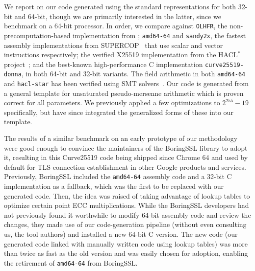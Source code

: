\documentclass[letterpaper,twocolumn,10pt]{article}
\begin{document}
We report on our code generated using the standard representations for both 32-bit and 64-bit, though we are primarily interested in the latter, since we benchmark on a 64-bit processor.
In order, we compare against \texttt{OLHFR}, the non-precomputation-based implementation from \cite{oliveira_sac2017}; \texttt{amd64-64} and \texttt{sandy2x}, the fastest assembly implementations from SUPERCOP~\cite{SUPERCOP} that use scalar and vector instructions respectively; the verified X25519 implementation from the HACL$^*$ project~\cite{hacl}; and the best-known high-performance C implementation \texttt{curve25519-donna}, in both 64-bit and 32-bit variants.
The field arithmetic in both \texttt{amd64-64} and \texttt{hacl-star} has been verified using SMT solvers~\cite{verif25519,ECCstar}.
Our code is generated from a general template for unsaturated pseudo-mersenne arithmetic which is proven correct for all parameters.
We previously applied a few optimizations to $2^{255}-19$ specifically, but have since integrated the generalized forms of these into our template.

The results of a similar benchmark on an early prototype of our methodology were good enough to convince the maintainers of the BoringSSL library to adopt it, resulting in this Curve25519 code being shipped since Chrome 64 and used by default for TLS connection establishment in other Google products and services.
Previously, BoringSSL included the \texttt{amd64-64} assembly code and a 32-bit C implementation as a fallback, which was the first to be replaced with our generated code.
Then, the idea was raised of taking advantage of lookup tables to optimize certain point ECC multiplications.
While the BoringSSL developers had not previously found it worthwhile to modify 64-bit assembly code and review the changes, they made use of our code-generation pipeline (without even consulting us, the tool authors) and installed a new 64-bit C version.
The new code (our generated code linked with manually written code using lookup tables) was more than twice as fast as the old version and was easily chosen for adoption, enabling the retirement of \texttt{amd64-64} from BoringSSL.
\end{document}
